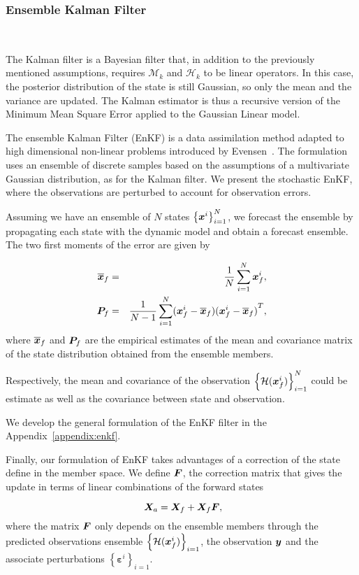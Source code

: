 \subsubsection{Ensemble Kalman Filter}~{\label{enkf}}


The Kalman filter \cite{kalman_new_1960} is a Bayesian filter that, in addition to the previously mentioned assumptions, requires $\mathcal{M}_k$ and $\mathcal{H}_k$ to be linear operators. In this case, the posterior distribution of the state is still Gaussian, so only the mean and the variance are updated. The Kalman estimator is thus a recursive version of the Minimum Mean Square Error applied to the Gaussian Linear model.

The ensemble Kalman Filter (EnKF) is a data assimilation method adapted to high dimensional non-linear problems introduced by Evensen~\cite{evensen_sequential_1994}. The formulation uses an ensemble of discrete samples based on the assumptions of a multivariate Gaussian distribution, as for the Kalman filter. We present the stochastic EnKF, where the observations are perturbed to account for observation errors.

Assuming we have an ensemble of $N$ states $\left\{\bm {\bm{x}}^i \right\}_{i=1}^N$, we forecast the ensemble by propagating each state with the dynamic model and obtain a forecast ensemble.
The two first moments of the error are given by

\begin{eqnarray*}
    \overline{\bm{x}}_f &=& \frac{1}{N} \sum_{i = 1}^{N} \bm{x}^i_f, \\
    \bm{P}_f &=& \frac{1}{N-1} \sum_{i = 1}^{N} (\bm{x}^i_f - \overline{\bm{x}}_f){(\bm{x}^i_f - \overline{\bm{x}}_f)}^T,
\end{eqnarray*}
where $\overline{\bm{x}}_f$ and $\bm{P}_f$ are the empirical estimates of the mean and covariance matrix of the state distribution obtained from the ensemble members.

Respectively, the mean and covariance of the observation $\left\{\mathcal{H}(\bm{x}^i_f) \right\}_{i=1}^N$ could be estimate as well as the covariance between state and observation.

We develop the general formulation of the EnKF filter in the Appendix~\ref{appendix:enkf}.

Finally, our formulation of EnKF takes advantages of a correction of the state define in the member space. We define $\bm{F}$, the correction matrix that gives the update in terms of linear combinations of the forward states

\begin{equation}~\label{enkf_formula_Fcorr}
    \bm{X}_a = \bm{X}_f + \bm{X}_f \bm{F},
\end{equation}where the matrix $\bm{F}$ only depends on the ensemble members through the predicted observations ensemble $\left\{\mathcal{H}(\bm{x}^i_f) \right\}_{i=1}$, the observation $\bm{y}$ and the associate perturbations  $\left\{\bm{\varepsilon}^i \right\}_{i=1}$.